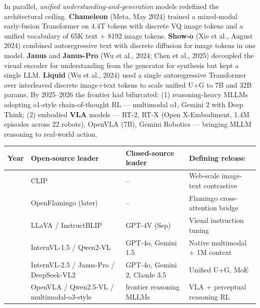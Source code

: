 In parallel, \emph{unified understanding-and-generation} models redefined the architectural ceiling. \textbf{Chameleon} (Meta, May 2024) trained a mixed-modal early-fusion Transformer on 4.4T tokens with discrete VQ image tokens and a unified vocabulary of 65K text + 8192 image tokens. \textbf{Show-o} (Xie et al., August 2024) combined autoregressive text with discrete diffusion for image tokens in one model. \textbf{Janus} and \textbf{Janus-Pro} (Wu et al., 2024; Chen et al., 2025) decoupled the visual encoder for understanding from the generator for synthesis but kept a single LLM. \textbf{Liquid} (Wu et al., 2024) used a single autoregressive Transformer over interleaved discrete image+text tokens to scale unified U+G to 7B and 32B params. By 2025--2026 the frontier had bifurcated: (1) reasoning-heavy MLLMs adopting o1-style chain-of-thought RL --- multimodal o1, Gemini 2 with Deep Think; (2) embodied \textbf{VLA} models --- RT-2, RT-X (Open X-Embodiment, 1.4M episodes across 22 robots), OpenVLA (7B), Gemini Robotics --- bringing MLLM reasoning to real-world action.

{\def\LTcaptype{none} %
\begin{longtable}[]{@{}
  >{\raggedright\arraybackslash}p{}
  >{\raggedright\arraybackslash}p{}
  >{\raggedright\arraybackslash}p{}
  >{\raggedright\arraybackslash}p{}@{}}
\toprule\noalign{}
\begin{minipage}[b]{\linewidth}\raggedright
\textbf{Year}
\end{minipage} & \begin{minipage}[b]{\linewidth}\raggedright
\textbf{Open-source leader}
\end{minipage} & \begin{minipage}[b]{\linewidth}\raggedright
\textbf{Closed-source leader}
\end{minipage} & \begin{minipage}[b]{\linewidth}\raggedright
\textbf{Defining release}
\end{minipage} \\
\midrule\noalign{}
\endhead
\bottomrule\noalign{}
\endlastfoot
2021 & CLIP & -- & Web-scale image-text contrastive \\
2022 & OpenFlamingo (later) & -- & Flamingo cross-attention bridge \\
2023 & LLaVA / InstructBLIP & GPT-4V (Sep) & Visual instruction tuning \\
2024 & InternVL-1.5 / Qwen2-VL & GPT-4o, Gemini 1.5 & Native multimodal + 1M context \\
2025 & InternVL-2.5 / Janus-Pro / DeepSeek-VL2 & GPT-4o, Gemini 2, Claude 3.5 & Unified U+G, MoE \\
2026 & OpenVLA / Qwen2.5-VL / multimodal-o3-style & frontier reasoning MLLMs & VLA + perceptual reasoning RL \\
\end{longtable}
}

